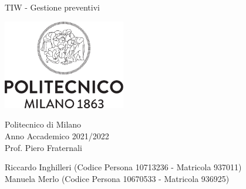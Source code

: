 \begin{titlepage}
	\begin{center}
		\vspace*{1cm}
		
		\Huge
		TIW - Gestione preventivi\\
		\vspace{4cm}
		
		\includegraphics[width=0.4\textwidth]{PureHTML_images/polimilogo}
		
		\vspace{3.5cm}
		\LARGE
		Politecnico di Milano\\
		Anno Accademico 2021/2022\\
		\vspace{0.5cm}
		\Large
		Prof. Piero Fraternali\\
		
		\vspace{5cm}
		
		{Riccardo Inghilleri (Codice Persona 10713236 - Matricola 937011)\\Manuela Merlo (Codice Persona 10670533 - Matricola 936925)}
		
		\vfill
		
		\vspace{0.8cm}
		
	\end{center}
\end{titlepage}